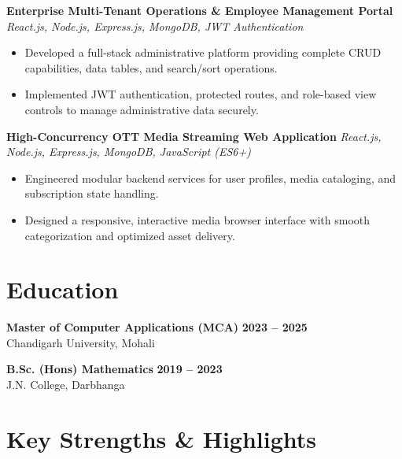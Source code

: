 \documentclass[a4paper,10pt]{article}
\begin{document}
\textbf{Enterprise Multi-Tenant Operations \& Employee Management Portal}
\hfill
\textit{React.js, Node.js, Express.js, MongoDB, JWT Authentication}

\begin{itemize}

    \item Developed a full-stack administrative platform providing complete CRUD capabilities, data tables, and search/sort operations.

    \item Implemented JWT authentication, protected routes, and role-based view controls to manage administrative data securely.

\end{itemize}


\textbf{High-Concurrency OTT Media Streaming Web Application}
\hfill
\textit{React.js, Node.js, Express.js, MongoDB, JavaScript (ES6+)}

\begin{itemize}

    \item Engineered modular backend services for user profiles, media cataloging, and subscription state handling.

    \item Designed a responsive, interactive media browser interface with smooth categorization and optimized asset delivery.

\end{itemize}

\section*{Education}

\textbf{Master of Computer Applications (MCA)}
\hfill
\textbf{2023 -- 2025}
\\
Chandigarh University, Mohali

\vspace{3pt}

\textbf{B.Sc. (Hons) Mathematics}
\hfill
\textbf{2019 -- 2023}
\\
J.N. College, Darbhanga

\section*{Key Strengths \& Highlights}
\end{document}
